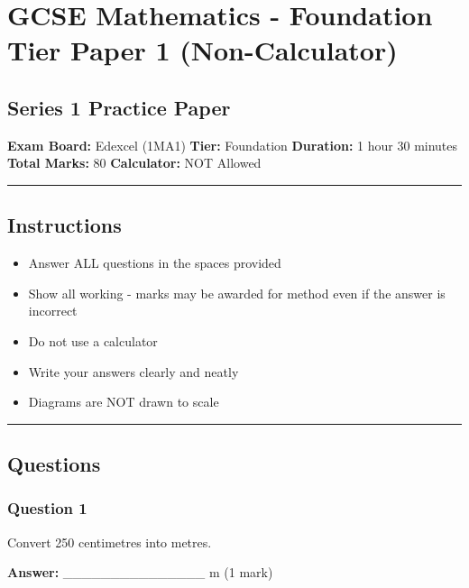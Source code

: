 \section{GCSE Mathematics - Foundation Tier Paper 1
(Non-Calculator)}\label{gcse-mathematics---foundation-tier-paper-1-non-calculator}

\subsection{Series 1 Practice Paper}\label{series-1-practice-paper}

\textbf{Exam Board:} Edexcel (1MA1) \textbf{Tier:} Foundation
\textbf{Duration:} 1 hour 30 minutes \textbf{Total Marks:} 80
\textbf{Calculator:} NOT Allowed

\begin{center}\rule{0.5\linewidth}{0.5pt}\end{center}

\subsection{Instructions}\label{instructions}

\begin{itemize}
\tightlist
\item
  Answer ALL questions in the spaces provided
\item
  Show all working - marks may be awarded for method even if the answer
  is incorrect
\item
  Do not use a calculator
\item
  Write your answers clearly and neatly
\item
  Diagrams are NOT drawn to scale
\end{itemize}

\begin{center}\rule{0.5\linewidth}{0.5pt}\end{center}

\subsection{Questions}\label{questions}

\subsubsection{Question 1}\label{question-1}

Convert 250 centimetres into metres.

\textbf{Answer:} \_\_\_\_\_\_\_\_\_\_\_\_\_\_\_ m (1 mark)

